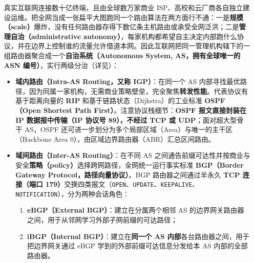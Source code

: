 真实互联网连接数十亿终端，且由全球数万家商业 ISP、高校和云厂商各自独立建设运维。把全网当成一张扁平大图跑同一个路由算法在两方面行不通：一是\textbf{规模（scale）}爆炸，没有任何路由器存得下数亿条主机路由或承受全网泛洪；二是\textbf{管理自治（administrative autonomy）}，每家机构都希望自主决定内部跑什么协议，并在边界上控制谁的流量允许借道本网。因此互联网把同一管理机构辖下的一组路由器聚合成一个\textbf{自治系统（Autonomous System, AS，拥有全球唯一的 ASN 编号）}，实行两级分治（详见）：
\begin{itemize}
\item \textbf{域内路由（Intra-AS Routing，又称 IGP）}：在同一个 AS 内部寻找最优路径，因为同属一家机构，无需商业策略壁垒，完全聚焦\textbf{转发性能}。代表协议有基于距离向量的 \textbf{RIP} 和基于链路状态（Dijkstra）的工业标准 \textbf{OSPF（Open Shortest Path First）}。注意协议栈细节：\textbf{OSPF 报文直接封装在 IP 数据报中传输（IP 协议号 89），不经过 TCP 或 UDP}；面对超大型骨干 AS，OSPF 还可进一步划分为多个局部区域（Area）与唯一的主干区（Backbone Area 0），由区域边界路由器（ABR）汇总区间路由。
\item \textbf{域间路由（Inter-AS Routing）}：在不同 AS 之间通告前缀可达性并按商业与安全\textbf{策略（policy）}选择跨网路径，全网统一运行事实标准 \textbf{BGP（Border Gateway Protocol，路径向量协议）}。BGP 路由器之间通过半永久 \textbf{TCP 连接（端口 179）}交换四类报文（\texttt{OPEN}、\texttt{UPDATE}、\texttt{KEEPALIVE}、\texttt{NOTIFICATION}），分为两种会话角色：
  \begin{enumerate}
  \item \textbf{eBGP（External BGP）}：建立在分属两个相邻 AS 的边界网关路由器之间，用于从邻网学习外部子网前缀的可达路径；
  \item \textbf{iBGP（Internal BGP）}：建立在\textbf{同一个 AS 内部}各台路由器之间，用于把边界网关通过 eBGP 学到的外部前缀可达信息分发给本 AS 内部的全部路由器。
  \end{enumerate}
\end{itemize}

